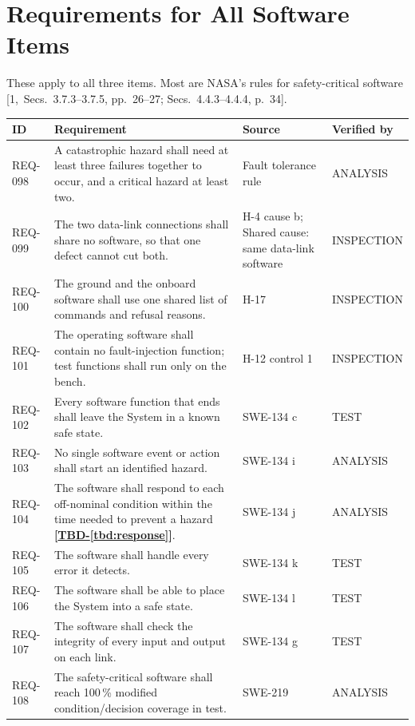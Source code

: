 \documentclass[11pt,a4paper]{article}
\newcommand{\tbd}[1]{\mbox{\textbf{[\hyperref[tbd:#1]{TBD-\ref*{tbd:#1}}]}}}
\begin{document}
\section{Requirements for All Software Items}
These apply to all three items. Most are NASA's rules for safety-critical
software [1,~Secs.~3.7.3--3.7.5, pp.~26--27; Secs.~4.4.3--4.4.4, p.~34].

{\footnotesize
\begin{xltabular}{\textwidth}{@{}l>{\raggedright\arraybackslash}X>{\raggedright\arraybackslash}p{3.2cm}>{\raggedright\arraybackslash}p{3.0cm}@{}}
\toprule
ID & Requirement & Source & Verified by \\
\midrule
\endhead
REQ-098 & A catastrophic hazard shall need at least three failures together to occur, and a critical hazard at least two. & Fault tolerance rule & ANALYSIS \\
REQ-099 & The two data-link connections shall share no software, so that one defect cannot cut both. & H-4 cause b; Shared cause: same data-link software & INSPECTION \\
REQ-100 & The ground and the onboard software shall use one shared list of commands and refusal reasons. & H-17 & INSPECTION \\
REQ-101 & The operating software shall contain no fault-injection function; test functions shall run only on the bench. & H-12 control 1 & INSPECTION \\
REQ-102 & Every software function that ends shall leave the System in a known safe state. & SWE-134 c & TEST \\
REQ-103 & No single software event or action shall start an identified hazard. & SWE-134 i & ANALYSIS \\
REQ-104 & The software shall respond to each off-nominal condition within the time needed to prevent a hazard \tbd{response}. & SWE-134 j & ANALYSIS \\
REQ-105 & The software shall handle every error it detects. & SWE-134 k & TEST \\
REQ-106 & The software shall be able to place the System into a safe state. & SWE-134 l & TEST \\
REQ-107 & The software shall check the integrity of every input and output on each link. & SWE-134 g & TEST \\
REQ-108 & The safety-critical software shall reach 100\,\% modified condition/decision coverage in test. & SWE-219 & ANALYSIS \\

\end{xltabular}}
\end{document}

